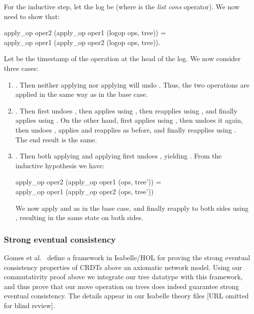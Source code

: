 \documentclass[sigplan,anonymous]{acmart}
\renewenvironment{isabelle}{%
  \medbreak\noindent%
  \renewcommand{\isanewline}{\\}%
  \begin{minipage}{\columnwidth}%
  \begin{isabellebody}%
  \begin{tabbing}%
}{%
  \end{tabbing}%
  \end{isabellebody}%
  \end{minipage}%
  \medbreak%
}
\begin{document}
For the inductive step, let the log be  (where \isa{\isacharhash} is the \emph{list cons} operator).
We now need to show that:
\begin{isabelle}
apply\_op oper2 (apply\_op oper1 (logop {\isacharhash} ops, tree)) =\\
apply\_op oper1 (apply\_op oper2 (logop {\isacharhash} ops, tree)).
\end{isabelle}
Let  be the timestamp of the operation at the head of the log.
We now consider three cases:
\begin{enumerate}
    \item {}.
        Then neither applying  nor applying  will undo .
        Thus, the two operations are applied in the same way as in the base case.
    \item {}.
        Then  first undoes , then applies  using , then reapplies  using , and finally applies  using .
        On the other hand,  first applies  using , then undoes it again, then undoes , applies  and reapplies  as before, and finally reapplies  using .
        The end result is the same.
    \item {}.
        Then both applying  and applying  first undoes , yielding .
        From the inductive hypothesis we have:
        \begin{isabelle}
        apply\_op oper2 (apply\_op oper1 (ops, tree')) =\\
        apply\_op oper1 (apply\_op oper2 (ops, tree'))
        \end{isabelle}
        We now apply  and  as in the base case, and finally reapply  to both sides using , resulting in the same state on both sides.
\end{enumerate}

\subsubsection{Strong eventual consistency}

Gomes et al.~\cite{Gomes:2017gy} define a framework in Isabelle/HOL for proving the strong eventual consistency properties of CRDTs above an axiomatic network model.
Using our commutativity proof above we integrate our tree datatype with this framework, and thus prove that our move operation on trees does indeed guarantee strong eventual consistency.
The details appear in our Isabelle theory files [URL omitted for blind review]. %
\end{document}

